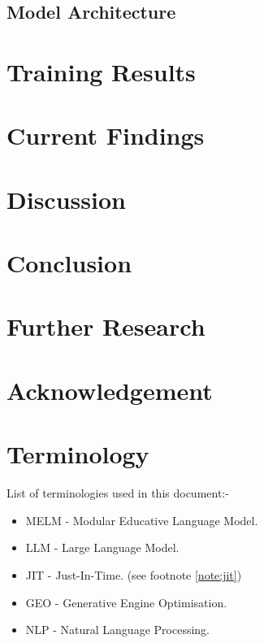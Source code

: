 \documentclass[conference]{IEEEtran}
\begin{document}
	\subsection{Model Architecture}

\section{Training Results}

\section{Current Findings}

	
\section{Discussion}

		
\section{Conclusion}

\section{Further Research}


\section{Acknowledgement}


\section{Terminology}
	List of terminologies used in this document:-
	\begin{itemize}
		\item MELM - Modular Educative Language Model.
		\item LLM - Large Language Model.
		\item JIT - Just-In-Time. (see footnote \ref{note:jit})
		\item GEO - Generative Engine Optimisation.
		\item NLP - Natural Language Processing.
	\end{itemize}
	

\nocite{*}
\renewcommand\refname{\section{Reference List}}
\small{
	}
\end{document}
